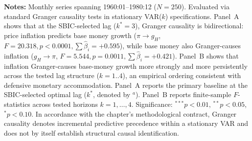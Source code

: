 \begin{table}[htbp]
\centering
\small
\renewcommand{\arraystretch}{0.90}
\caption{Granger Directional Precedence: Master Nominal Core System (Chile, 1960--1980, $N=250$)}
\label{tab:granger_nominal_core}
\begin{minipage}{0.96\textwidth}
\vspace{0.3em}
\footnotesize \textbf{Notes:} Monthly series spanning 1960:01--1980:12 ($N=250$). Evaluated via standard Granger causality tests in stationary VAR($k$) specifications. Panel~A shows that at the SBIC-selected lag ($k^*=3$), Granger causality is bidirectional: price inflation predicts base money growth ($\pi \to g_H$, $F = 20.318, p < 0.0001, \sum \hat{\beta}_i = +0.595$), while base money also Granger-causes inflation ($g_H \to \pi$, $F = 5.544, p = 0.0011, \sum \hat{\beta}_i = +0.421$). Panel~B shows that inflation Granger-causes base-money growth more strongly and more persistently across the tested lag structure ($k=1..4$), an empirical ordering consistent with defensive monetary accommodation. Panel~A reports the primary baseline at the SBIC-selected optimal lag ($k^*$, denoted by $^a$). Panel~B reports finite-sample $F$-statistics across tested horizons $k = 1, \dots, 4$. Significance: $^{***} p < 0.01$, $^{**} p < 0.05$, $^{*} p < 0.10$. In accordance with the chapter's methodological contract, Granger causality denotes incremental predictive precedence within a stationary VAR and does not by itself establish structural causal identification.
\end{minipage}
\end{table}
